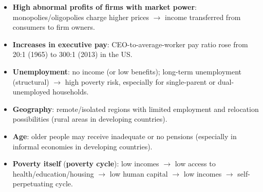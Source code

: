 \begin{itemize}
  \item \textbf{High abnormal profits of firms with market power}: monopolies/oligopolies charge higher prices $\to$ income transferred from consumers to firm owners.
  \item \textbf{Increases in executive pay}: CEO-to-average-worker pay ratio rose from 20:1 (1965) to 300:1 (2013) in the US.
  \item \textbf{Unemployment}: no income (or low benefits); long-term unemployment (structural) $\to$ high poverty risk, especially for single-parent or dual-unemployed households.
  \item \textbf{Geography}: remote/isolated regions with limited employment and relocation possibilities (rural areas in developing countries).
  \item \textbf{Age}: older people may receive inadequate or no pensions (especially in informal economies in developing countries).
  \item \textbf{Poverty itself} (\textbf{poverty cycle}): low incomes $\to$ low access to health/education/housing $\to$ low human capital $\to$ low incomes $\to$ self-perpetuating cycle.
\end{itemize}
